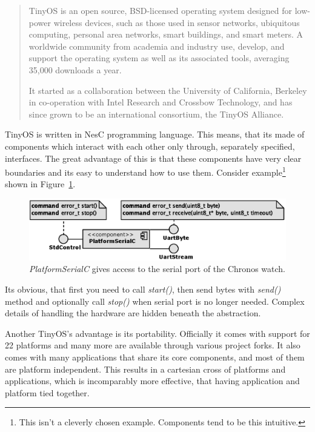 \begin{quotation}
TinyOS is an open source, BSD-licensed operating system designed for
low-power wireless devices, such as those used in sensor networks,
ubiquitous computing, personal area networks, smart buildings, and
smart meters. A worldwide community from academia and industry use,
develop, and support the operating system as well as its associated
tools, averaging 35,000 downloads a year.

It started as a collaboration between the University of
California, Berkeley in co-operation with Intel Research and Crossbow
Technology, and has since grown to be an international consortium, the
TinyOS Alliance.

{\hfill \cite{TOSnet,TOSw}}
\end{quotation}
TinyOS is written in NesC programming language. This means, that its
made of components which interact with each other only through,
separately specified, interfaces. The great advantage of this is
that these components have very clear boundaries and its easy to
understand how to use them. Consider example\footnote{This isn't a
cleverly chosen example. Components tend to be this intuitive.} shown
in Figure~\ref{fig:platform_serial}.
\begin{figure}[h]
  \centering
  \includegraphics{diagrams/platform_serial.eps}
  \caption{\emph{PlatformSerialC} gives access to the serial port of the 
           Chronos watch.}
  \label{fig:platform_serial}
\end{figure}
Its obvious, that first you need to call \emph{start()}, then send
bytes with \emph{send()} method and optionally call \emph{stop()} when
serial port is no longer needed. Complex details of handling the
hardware are hidden beneath the abstraction.

Another TinyOS's advantage is its portability. Officially it comes
with support for 22 platforms and many more are available through
various project forks. It also comes with many applications that share
its core components, and most of them are platform independent. This
results in a cartesian cross of platforms and applications, which is
incomparably more effective, that having application and platform
tied together.

